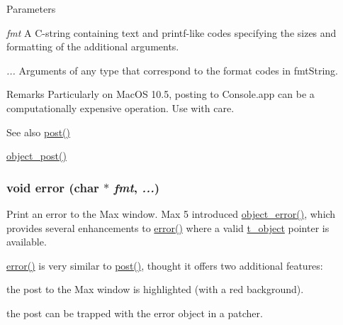 \begin{DoxyParams}{Parameters}
\item[{\em fmt}]A C-\/string containing text and printf-\/like codes specifying the sizes and formatting of the additional arguments. \item[{\em ...}]Arguments of any type that correspond to the format codes in fmtString.\end{DoxyParams}
\begin{DoxyRemark}{Remarks}
Particularly on MacOS 10.5, posting to Console.app can be a computationally expensive operation. Use with care.
\end{DoxyRemark}
\begin{DoxySeeAlso}{See also}
\hyperlink{group__console_ga3714108f42b44384b4d58009eafc1806}{post()} 

\hyperlink{group__console_gafb92b17363269d4d26de1823cbc2492d}{object\_\-post()} 
\end{DoxySeeAlso}
\hypertarget{group__console_gaa7733e30b2951f225e24dca1ed4632b2}{
\subsubsection[{error}]{\setlength{\rightskip}{0pt plus 5cm}void error (char $\ast$ {\em fmt}, \/   {\em ...})}}
\label{group__console_gaa7733e30b2951f225e24dca1ed4632b2}


Print an error to the Max window. Max 5 introduced \hyperlink{group__console_ga05f7fed66fafc6e4d2e372b7f0fe4e43}{object\_\-error()}, which provides several enhancements to \hyperlink{group__console_gaa7733e30b2951f225e24dca1ed4632b2}{error()} where a valid \hyperlink{structt__object}{t\_\-object} pointer is available.

\hyperlink{group__console_gaa7733e30b2951f225e24dca1ed4632b2}{error()} is very similar to \hyperlink{group__console_ga3714108f42b44384b4d58009eafc1806}{post()}, thought it offers two additional features:
\begin{DoxyItemize}
\item the post to the Max window is highlighted (with a red background).
\item the post can be trapped with the error object in a patcher.
\end{DoxyItemize}


